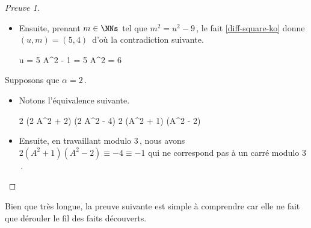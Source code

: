 \begin{proof}[Preuve 1]
\begin{itemize}
		\item Ensuite, prenant $m \in \NNs$ tel que $m^2 = u^2 - 9$\,, le fait \ref{diff-square-ko} donne $(u, m) = (5, 4)$\, d'où la contradiction suivante.
        
        \noindent\kern-6pt%
        \begin{stepcalc}[style=ar*, ope=\iff]
        	u = 5
    	\explnext{}
        	A^2 - 1 = 5
        	A^2 = 6
        \end{stepcalc}
    \end{itemize}
    
    \medskip
    
    Supposons que $\alpha = 2$\,.
    
    \begin{itemize}
    	\item Notons l'équivalence suivante.
        
        \noindent\kern-6pt%
        \begin{stepcalc}[style=ar*, ope=\iff]
        	2 (2 A^2 + 2) (2 A^2 - 4) \in \NNssquare
        	2 (A^2 + 1) (A^2 - 2) \in \NNssquare
        \end{stepcalc}

		\item Ensuite, en travaillant modulo $3$\,, nous avons
		$2 (A^2 + 1) (A^2 - 2) \equiv -4 \equiv -1$ qui ne correspond pas à un carré modulo $3$\,.
		\qedhere 
    \end{itemize}   
\end{proof}





Bien que très longue, la preuve suivante est simple à comprendre car elle ne fait que dérouler le fil des faits découverts.

